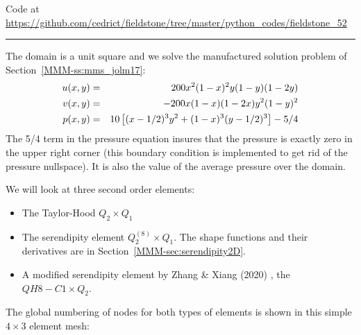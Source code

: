 

\begin{center}
Code at \url{https://github.com/cedrict/fieldstone/tree/master/python_codes/fieldstone_52}
\end{center}

\par\noindent\rule{\textwidth}{0.4pt}


The domain is a unit square and we solve the manufactured solution problem of 
Section~\ref{MMM-ss:mms_jolm17}:
\begin{eqnarray}
u(x,y) &=& 200x^2(1-x)^2y(1-y)(1-2y) \nonumber\\
v(x,y) &=& -200x(1-x)(1-2x)y^2(1-y)^2 \nonumber\\
p(x,y) &=& 10\left[(x-1/2)^3y^2+(1-x)^3(y-1/2)^3 \right] -5/4 \nonumber
\end{eqnarray}
The 5/4 term in the pressure equation insures that the pressure is exactly zero in the 
upper right corner (this boundary condition is implemented to get rid of 
the pressure nullspace). It is also the value of the average pressure over the domain.

We will look at three second order elements:
\begin{itemize}
\item The Taylor-Hood $Q_2\times Q_1$ 
\item The serendipity element $Q_2^{(8)}\times Q_1$. The shape functions 
and their derivatives are in Section~\ref{MMM-sec:serendipity2D}.
\item A modified serendipity element by 
Zhang \& Xiang (2020) \cite{zhxi20}, the $QH8-C1 \times Q_2$.
\end{itemize}

The global numbering of nodes for both types of elements is shown  
in this simple $4\times 3$ element mesh:

